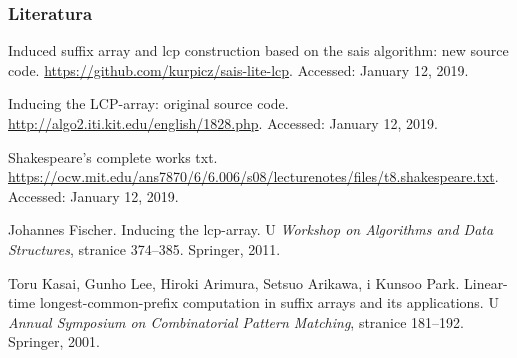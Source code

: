 \documentclass{beamer}
\begin{document}

\begin{frame}
\frametitle{Literatura}
\footnotesize{
\begin{thebibliography}{99}%
Induced suffix array and lcp construction based on the sais algorithm: new
  source code.
\newblock \url{https://github.com/kurpicz/sais-lite-lcp}.
\newblock Accessed: January 12, 2019.

Inducing the {LCP}-array: original source code.
\newblock \url{http://algo2.iti.kit.edu/english/1828.php}.
\newblock Accessed: January 12, 2019.

Shakespeare's complete works txt.
\newblock
  \url{https://ocw.mit.edu/ans7870/6/6.006/s08/lecturenotes/files/t8.shakespeare.txt}.
\newblock Accessed: January 12, 2019.

Johannes Fischer.
\newblock Inducing the lcp-array.
\newblock U \emph{Workshop on Algorithms and Data Structures}, stranice
  374--385. Springer, 2011.

Toru Kasai, Gunho Lee, Hiroki Arimura, Setsuo Arikawa, i Kunsoo Park.
\newblock Linear-time longest-common-prefix computation in suffix arrays and
  its applications.
\newblock U \emph{Annual Symposium on Combinatorial Pattern Matching}, stranice
  181--192. Springer, 2001.
\end{thebibliography}
}
\end{frame}
\end{document}
